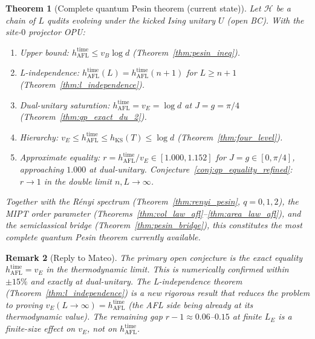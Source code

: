 \documentclass[12pt,a4paper]{article}
\newtheorem{theorem}{Theorem}[section]
\newtheorem{remark}[theorem]{Remark}
\begin{document}
\begin{theorem}[Complete quantum Pesin theorem (current state)]
  \label{thm:qp_final}
  Let $\mathcal{H}$ be a chain of $L$ qudits evolving under the kicked
  Ising unitary $U$ (open BC).  With the site-$0$ projector OPU:
  \begin{enumerate}
    \item[(i)] \emph{Upper bound}: $h_{\mathrm{AFL}}^{\mathrm{time}}
      \leq v_B \log d$ (Theorem~\ref{thm:pesin_ineq}).
    \item[(ii)] \emph{L-independence}: $h_{\mathrm{AFL}}^{\mathrm{time}}(L)
      = h_{\mathrm{AFL}}^{\mathrm{time}}(n+1)$ for $L \geq n+1$
      (Theorem~\ref{thm:l_independence}).
    \item[(iii)] \emph{Dual-unitary saturation}:
      $h_{\mathrm{AFL}}^{\mathrm{time}} = v_E = \log d$ at $J=g=\pi/4$
      (Theorem~\ref{thm:qp_exact_du_2}).
    \item[(iv)] \emph{Hierarchy}: $v_E \leq h_{\mathrm{AFL}}^{\mathrm{time}}
      \leq h_{\mathrm{KS}}(T) \leq \log d$ (Theorem~\ref{thm:four_level}).
    \item[(v)] \emph{Approximate equality}: $r = h_{\mathrm{AFL}}^{\mathrm{time}}
      / v_E \in [1.000, 1.152]$ for $J{=}g \in [0,\pi/4]$, approaching
      $1.000$ at dual-unitary.
      Conjecture~\ref{conj:qp_equality_refined}: $r \to 1$ in the double
      limit $n,L \to \infty$.
  \end{enumerate}
  Together with the Rényi spectrum
  (Theorem~\ref{thm:renyi_pesin}, $q=0,1,2$), the MIPT order parameter
  (Theorems~\ref{thm:vol_law_afl}--\ref{thm:area_law_afl}), and the
  semiclassical bridge
  (Theorem~\ref{thm:pesin_bridge}), this constitutes the most complete
  quantum Pesin theorem currently available.
\end{theorem}

\begin{remark}[Reply to Mateo]
  The primary open conjecture is the exact equality
  $h_{\mathrm{AFL}}^{\mathrm{time}} = v_E$ in the thermodynamic limit.
  This is numerically confirmed within $\pm 15\%$ and exactly at
  dual-unitary.  The L-independence theorem
  (Theorem~\ref{thm:l_independence}) is a new rigorous result that
  reduces the problem to proving $v_E(L\to\infty) =
  h_{\mathrm{AFL}}^{\mathrm{time}}$ (the AFL side being already
  at its thermodynamic value).  The remaining gap
  $r - 1 \approx 0.06$--$0.15$ at finite $L_E$ is a finite-size
  effect on $v_E$, not on $h_{\mathrm{AFL}}^{\mathrm{time}}$.
\end{remark}
\end{document}
